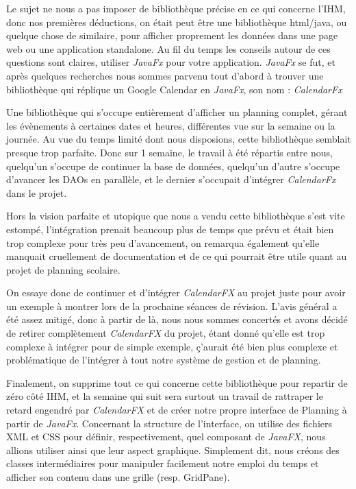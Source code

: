 \documentclass[a4paper,french,final]{memoir}
\begin{document}
Le sujet ne nous a pas imposer de bibliothèque précise en ce qui concerne l'IHM, donc nos premières déductions, on était peut être une bibliothèque html/java, ou quelque chose de similaire, pour afficher proprement les données dans une page web ou une application standalone.
Au fil du temps les conseils autour de ces questions sont claires, utiliser \emph{JavaFx} pour votre application.
\emph{JavaFx} se fut, et après quelques recherches nous sommes parvenu tout d'abord à trouver une bibliothèque qui réplique un Google Calendar en \emph{JavaFx}, son nom : \emph{CalendarFx}

Une bibliothèque qui s'occupe entièrement d'afficher un planning complet, gérant les évènements à certaines dates et heures, différentes vue sur la semaine ou la journée. Au vue du temps limité dont nous disposions, cette bibliothèque semblait presque trop parfaite.
Donc sur 1 semaine, le travail à été répartis entre nous, quelqu'un s'occupe de continuer la base de données, quelqu'un d'autre s'occupe d'avancer les DAOs en parallèle, et le dernier s'occupait d'intégrer \emph{CalendarFx} dans le projet.

Hors la vision parfaite et utopique que nous a vendu cette bibliothèque s'est vite estompé, l'intégration prenait beaucoup plus de temps que prévu et était bien trop complexe pour très peu d'avancement, on remarqua également qu'elle manquait cruellement de documentation et de ce qui pourrait être utile quant au projet de planning scolaire.

 On essaye donc de continuer et d'intégrer \emph{CalendarFX} au projet juste pour avoir un exemple à montrer lors de la prochaine séances de révision. 
L'avis général a été assez mitigé, donc à partir de là, nous nous sommes concertés et avons décidé de retirer complètement \emph{CalendarFX} du projet, étant donné qu'elle est trop complexe à intégrer pour de simple exemple, ç'aurait été bien plus complexe et problématique de l'intégrer à tout notre système de gestion et de planning.

Finalement, on supprime tout ce qui concerne cette bibliothèque pour repartir de zéro côté IHM, et la semaine qui suit sera surtout un travail de rattraper le retard engendré par \emph{CalendarFX} et de créer notre propre interface de Planning à partir de \emph{JavaFx}.
Concernant la structure de l'interface, on utilise des fichiers XML et CSS pour définir, respectivement, quel composant de \emph{JavaFX}, nous allions utiliser ainsi que leur aspect graphique.
Simplement dit, nous créons des classes intermédiaires pour manipuler facilement notre emploi du temps et afficher son contenu dans une grille (resp. GridPane).
\end{document}
